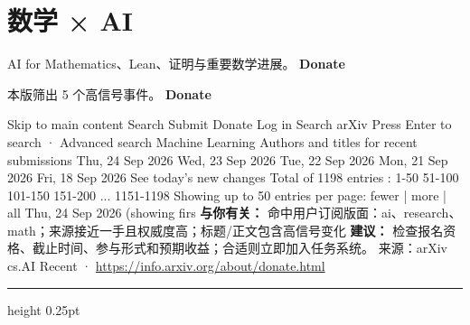 \documentclass[10.5pt]{ctexart}
\begin{document}
\section*{数学 × AI}
{\color{ormuted} AI for Mathematics、Lean、证明与重要数学进展。}
\vspace{2mm}
{\LARGE\bfseries Donate}\par
\vspace{1mm}
{\color{ormuted} 本版筛出 5 个高信号事件。}
\vspace{3mm}
{\Large\bfseries Donate}\par
Skip to main content Search Submit Donate Log in Search arXiv Press Enter to search · Advanced search Machine Learning Authors and titles for recent submissions Thu, 24 Sep 2026 Wed, 23 Sep 2026 Tue, 22 Sep 2026 Mon, 21 Sep 2026 Fri, 18 Sep 2026 See today's new changes Total of 1198 entries : 1-50 51-100 101-150 151-200 ... 1151-1198 Showing up to 50 entries per page: fewer | more | all Thu, 24 Sep 2026 (showing firs
\textbf{与你有关：} 命中用户订阅版面：ai、research、math；来源接近一手且权威度高；标题/正文包含高信号变化
\textbf{建议：} 检查报名资格、截止时间、参与形式和预期收益；合适则立即加入任务系统。
{\footnotesize\color{ormuted} 来源：arXiv cs.AI Recent · \url{https://info.arxiv.org/about/donate.html}}
\vspace{4mm}
\hrule height 0.25pt
\vspace{3mm}
\end{document}
